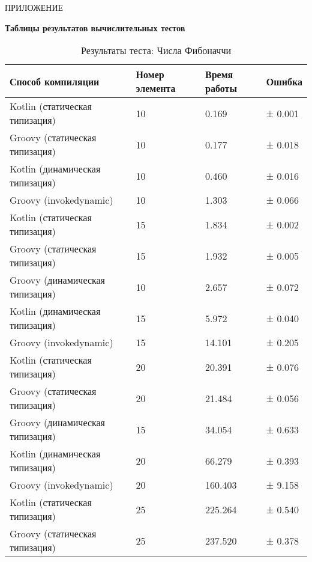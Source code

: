 \vfill
\clearpage
\appendix


    \hfill ПРИЛОЖЕНИЕ 
    \begin{center}
        \bf{Таблицы результатов вычислительных тестов}
    \end{center}
    \markboth{\MakeUppercase{}}{}
    
    \begin{table}[h]
\caption{\label{tab:fibBenchResults}Результаты теста: Числа Фибоначчи}
\begin{center}
\begin{tabular}{|l|p{}|l|l|}
\hline
Способ компиляции & Номер элемента & Время работы & Ошибка \\
\hline
Kotlin (статическая типизация)          & 10 &    0.169 & ±   0.001\\
Groovy (статическая типизация)          & 10 &    0.177 & ±   0.018\\
Kotlin (динамическая типизация)         & 10 &    0.460 & ±   0.016\\
Groovy (invokedynamic)                  & 10 &    1.303 & ±   0.066\\
Kotlin (статическая типизация)          & 15 &    1.834 & ±   0.002\\
Groovy (статическая типизация)          & 15 &    1.932 & ±   0.005\\
Groovy (динамическая типизация)         & 10 &    2.657 & ±   0.072\\
Kotlin (динамическая типизация)         & 15 &    5.972 & ±   0.040\\
Groovy (invokedynamic)                  & 15 &   14.101 & ±   0.205\\
Kotlin (статическая типизация)          & 20 &   20.391 & ±   0.076\\
Groovy (статическая типизация)          & 20 &   21.484 & ±   0.056\\
Groovy (динамическая типизация)         & 15 &   34.054 & ±   0.633\\
Kotlin (динамическая типизация)         & 20 &   66.279 & ±   0.393\\
Groovy (invokedynamic)                  & 20 &  160.403 & ±   9.158\\
Kotlin (статическая типизация)          & 25 &  225.264 & ±   0.540\\
Groovy (статическая типизация)          & 25 &  237.520 & ±   0.378\\

\end{tabular}
\end{center}
\end{table}
